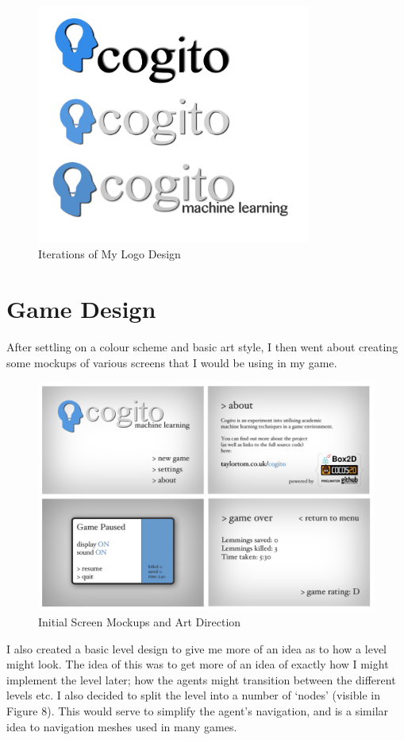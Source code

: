 \documentclass[a4paper,oneside]{report}
\begin{document}
\begin{figure}[h!]
  \centering
    \includegraphics[width=90mm]{sources/images/cogito_logo1}
    \caption{Iterations of My Logo Design}
\end{figure}

\section{Game Design}

After settling on a colour scheme and basic art style, I then went about creating some mockups of various screens that I would be using in my game.
	
\begin{figure}[h!]
  \centering
    \includegraphics[width=140mm]{sources/images/Screens}
    \caption{Initial Screen Mockups and Art Direction}
\end{figure}

I also created a basic level design to give me more of an idea as to how a level might look. The idea of this was to get more of an idea of exactly how I might implement the level later; how the agents might transition between the different levels etc. I also decided to split the level into a number of `nodes' (visible in Figure 8). This would serve to simplify the agent's navigation, and is a similar idea to navigation meshes used in many games.  
\end{document}

